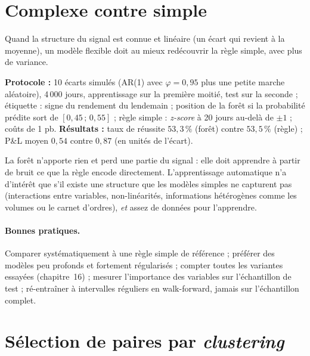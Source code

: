 \section{Complexe contre simple}

Quand la structure du signal est connue et linéaire (un écart qui revient à la moyenne), un modèle flexible doit au mieux redécouvrir la règle simple, avec plus de variance.

\begin{codebox}
\textbf{Protocole :} 10 écarts simulés (AR(1) avec $\varphi = 0{,}95$ plus une petite marche aléatoire), 4\,000 jours, apprentissage sur la première moitié, test sur la seconde ; étiquette : signe du rendement du lendemain ; position de la forêt si la probabilité prédite sort de $[0{,}45\,;\,0{,}55]$ ; règle simple : \emph{z-score} à 20 jours au-delà de $\pm1$ ; coûts de 1 pb. \textbf{Résultats :} taux de réussite $53{,}3\,\%$ (forêt) contre $53{,}5\,\%$ (règle) ; P\&L moyen $0{,}54$ contre $0{,}87$ (en unités de l'écart).
\end{codebox}

La forêt n'apporte rien et perd une partie du signal : elle doit apprendre à partir de bruit ce que la règle encode directement. L'apprentissage automatique n'a d'intérêt que s'il existe une structure que les modèles simples ne capturent pas (interactions entre variables, non-linéarités, informations hétérogènes comme les volumes ou le carnet d'ordres), \emph{et} assez de données pour l'apprendre.

\paragraph{Bonnes pratiques.} Comparer systématiquement à une règle simple de référence ; préférer des modèles peu profonds et fortement régularisés ; compter toutes les variantes essayées (chapitre~16) ; mesurer l'importance des variables sur l'échantillon de test ; ré-entraîner à intervalles réguliers en walk-forward, jamais sur l'échantillon complet.

\section{Sélection de paires par \emph{clustering}}

